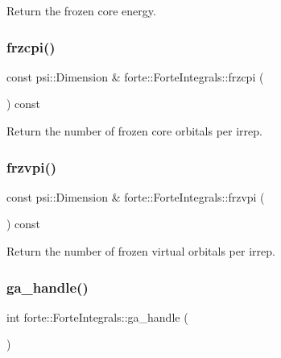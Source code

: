 Return the frozen core energy. 

\mbox{\label{classforte_1_1_forte_integrals_a944cff5a804957677551420b35443a5c}} 
\subsubsection{\texorpdfstring{frzcpi()}{frzcpi()}}
{\footnotesize\ttfamily const psi\+::\+Dimension \& forte\+::\+Forte\+Integrals\+::frzcpi (\begin{DoxyParamCaption}{ }\end{DoxyParamCaption}) const}



Return the number of frozen core orbitals per irrep. 

\mbox{\label{classforte_1_1_forte_integrals_a9ec81966b5288931a2116e6f2f34a85d}} 
\subsubsection{\texorpdfstring{frzvpi()}{frzvpi()}}
{\footnotesize\ttfamily const psi\+::\+Dimension \& forte\+::\+Forte\+Integrals\+::frzvpi (\begin{DoxyParamCaption}{ }\end{DoxyParamCaption}) const}



Return the number of frozen virtual orbitals per irrep. 

\mbox{\label{classforte_1_1_forte_integrals_ae3bb9e1cbe8b4a39e3befb070b41018f}} 
\subsubsection{\texorpdfstring{ga\+\_\+handle()}{ga\_handle()}}
{\footnotesize\ttfamily int forte\+::\+Forte\+Integrals\+::ga\+\_\+handle (\begin{DoxyParamCaption}{ }\end{DoxyParamCaption})\hspace{0.3cm}{\ttfamily [virtual]}}

